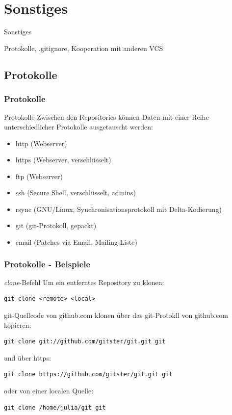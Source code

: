 \documentclass{beamer}
\begin{document}
\section{Sonstiges}
\begin{frame}[c]
\begin{center}
\begin{Huge}
Sonstiges 
\end{Huge}

Protokolle, .gitignore, Kooperation mit anderen VCS
\end{center}
\end{frame}

\subsection{Protokolle}

\begin{frame}[fragile]\frametitle{Protokolle}
\begin{block} {Protokolle}
Zwischen den Repositories können Daten mit einer Reihe unterschiedlicher Protokolle ausgetauscht werden:
\begin{itemize}
\item http (Webserver)
\item https (Webserver, verschlüsselt)
\item ftp (Webserver)
\item ssh (Secure Shell, verschlüsselt, admins)
\item rsync (GNU/Linux, Synchronisationsprotokoll mit Delta-Kodierung)
\item git (git-Protokoll, gepackt)
\item email (Patches via Email, Mailing-Liste)
\end{itemize}
\end{block}
\end{frame}

\begin{frame}[fragile]\frametitle{Protokolle - Beispiele}
\begin{block} {\textit{clone}-Befehl}
Um ein entferntes Repository zu klonen:
\begin{lstlisting}
git clone <remote> <local>
\end{lstlisting}
\end{block}
\begin{exampleblock} {git-Quellcode von github.com klonen}
über das git-Protokll von github.com kopieren:
\begin{lstlisting}
git clone git://github.com/gitster/git.git git
\end{lstlisting}
und über https:
\begin{lstlisting}
git clone https://github.com/gitster/git.git git
\end{lstlisting}
oder von einer localen Quelle:
\begin{lstlisting}
git clone /home/julia/git git
\end{lstlisting}
\end{exampleblock}
\end{frame}
\end{document}
